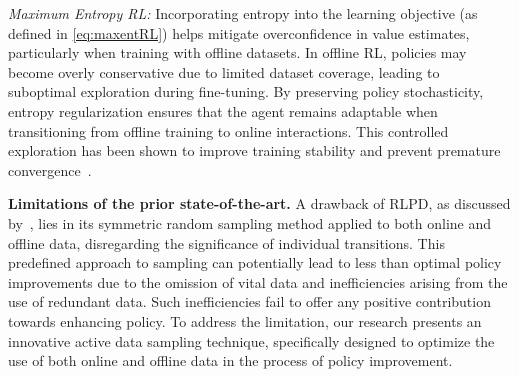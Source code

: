 \emph{Maximum Entropy RL:} %
Incorporating entropy into the learning objective (as defined in \eqref{eq:maxentRL})  helps mitigate overconfidence in value estimates, particularly when training with offline datasets. In offline RL, policies may become overly conservative due to limited dataset coverage, leading to suboptimal exploration during fine-tuning. By preserving policy stochasticity, entropy regularization ensures that the agent remains adaptable when transitioning from offline training to online interactions. This controlled exploration has been shown to improve training stability and prevent premature convergence~\citep{haarnoja2018soft, chen2021randomized, hiraoka2021dropout, ball2023efficient}.



\textbf{Limitations of the prior state-of-the-art.} 
A drawback of RLPD, as discussed by~\citet{ball2023efficient}, lies in its symmetric random sampling method applied to both online and offline data, disregarding the significance of individual transitions. This predefined approach to sampling can potentially lead to less than optimal policy improvements due to the omission of vital data and inefficiencies arising from the use of redundant data. Such inefficiencies fail to offer any positive contribution towards enhancing policy. To address the limitation, our research presents an innovative active data sampling technique, specifically designed to optimize the use of both online and offline data in the process of policy improvement.
